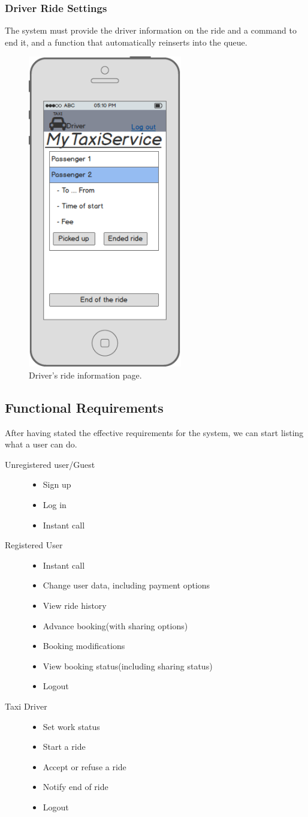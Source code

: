 		\subsubsection {Driver Ride Settings}
			The system must provide the driver information on the ride and a command to end it, and a function that automatically reinserts into the queue.
		 	\begin{figure}[h!]
				\includegraphics[width=0.6\textwidth, width=3cm]{mockup/appdriveron}
				\caption{Driver's ride information page.}
			\end{figure}
			\newpage
\subsection{Functional Requirements}
	After having stated the effective requirements for the system, we can start listing what a user can do.
		\begin{description}
		\item[Unregistered user/Guest] \hfill
			\begin{itemize}
				\item Sign up
				\item Log in
				\item Instant call
			\end{itemize}
		\item[Registered User] \hfill
			\begin{itemize}
				\item Instant call
				\item Change user data, including payment options
				\item View ride history
				\item Advance booking(with sharing options)
				\item Booking modifications
				\item View booking status(including sharing status)
				\item Logout
			\end{itemize}
		\item[Taxi Driver] \hfill
			\begin{itemize}
				\item Set work status
				\item Start a ride
				\item Accept or refuse a ride
				\item Notify end of ride
				\item Logout
			\end{itemize}
		\end{description}
\newpage
